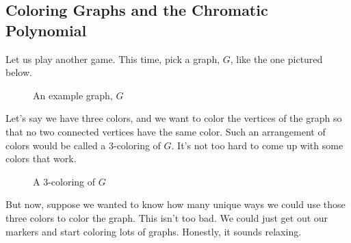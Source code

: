 \documentclass[12pt,oneside]{../../sfsuthesis}
\begin{document}
\subsection{Coloring Graphs and the Chromatic Polynomial}

Let us play another game.
This time, pick a graph, \( G \), like the one pictured below.

\begin{figure}[H]
    \centering
    \caption{An example graph, \(G\)}
\end{figure}

Let's say we have three colors, and we want to color the vertices of the graph so that no two connected vertices have the same color.
Such an arrangement of colors would be called a 3-coloring of \( G \).
It's not too hard to come up with some colors that work.

\begin{figure}[H]
    \centering
    \caption{A 3-coloring of \(G\)}
\end{figure}

But now, suppose we wanted to know how many unique ways we could use those three colors to color the graph.
This isn't too bad.
We could just get out our markers and start coloring lots of graphs.
Honestly, it sounds relaxing.
\end{document}
